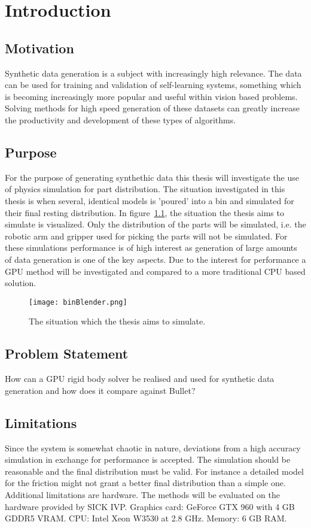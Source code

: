 \chapter{Introduction}\label{cha:intro}

\section{Motivation}

Synthetic data generation is a subject with increasingly high relevance.
The data can be used for training and validation of self-learning systems,
something which is becoming increasingly more popular and useful within vision
based problems. Solving methods for high speed generation of these datasets
can greatly increase the productivity and development of these
types of algorithms.

\section{Purpose}

For the purpose of generating synthethic data this thesis will investigate the use of physics
simulation for part distribution. The situation investigated in this thesis
is when several, identical models is  'poured' into a bin and simulated for their
final resting distribution. In figure~\ref{fig:plb}, the situation
the thesis aims to simulate is visualized. Only the distribution of the parts
will be simulated, i.e. the robotic arm and gripper used for picking the parts will not be simulated. For these simulations
performance is of high interest as generation of large amounts of data generation
is one of the key aspects. Due to the interest for performance a GPU method will
be investigated and compared to a more traditional CPU based solution.

\begin{figure}[ht]
  \centering
  \texttt{[image: binBlender.png]}
  \caption{The situation which the thesis aims to simulate.}
  \label{fig:plb}
\end{figure}

\section{Problem Statement}
How can a GPU rigid body solver be realised and used for synthetic data generation
 and how does it compare against Bullet?

\section{Limitations}
Since the system is somewhat chaotic in nature, deviations from a high accuracy
simulation in exchange for performance is accepted. The simulation should be reasonable
and the final distribution must be valid. For instance a detailed
model for the friction might not grant a better final distribution than a simple one.
Additional limitations are hardware. The methods will be evaluated on the hardware
provided by SICK IVP. Graphics card: GeForce GTX 960 with 4 GB GDDR5 VRAM.
CPU: Intel Xeon W3530 at 2.8 GHz.
Memory: 6 GB RAM.

